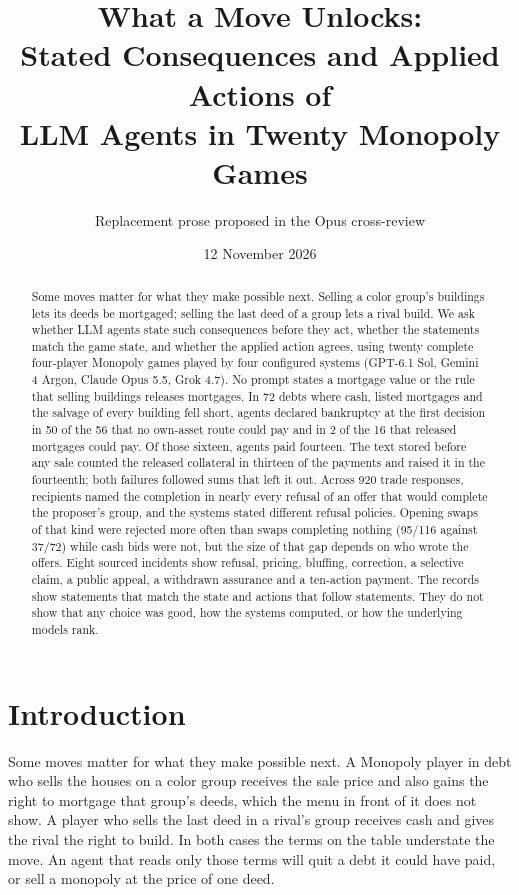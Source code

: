 \documentclass[11pt,letterpaper]{article}
\title{What a Move Unlocks:\\Stated Consequences and Applied Actions of\\LLM Agents in Twenty Monopoly Games}
\author{Replacement prose proposed in the Opus cross-review}
\date{12 November 2026}
\begin{document}
\maketitle

\begin{abstract}
Some moves matter for what they make possible next. Selling a color group's buildings lets its deeds be mortgaged; selling the last deed of a group lets a rival build. We ask whether LLM agents state such consequences before they act, whether the statements match the game state, and whether the applied action agrees, using twenty complete four-player Monopoly games played by four configured systems (GPT-6.1 Sol, Gemini 4 Argon, Claude Opus 5.5, Grok 4.7). No prompt states a mortgage value or the rule that selling buildings releases mortgages. In 72 debts where cash, listed mortgages and the salvage of every building fell short, agents declared bankruptcy at the first decision in 50 of the 56 that no own-asset route could pay and in 2 of the 16 that released mortgages could pay. Of those sixteen, agents paid fourteen. The text stored before any sale counted the released collateral in thirteen of the payments and raised it in the fourteenth; both failures followed sums that left it out. Across 920 trade responses, recipients named the completion in nearly every refusal of an offer that would complete the proposer's group, and the systems stated different refusal policies. Opening swaps of that kind were rejected more often than swaps completing nothing (95/116 against 37/72) while cash bids were not, but the size of that gap depends on who wrote the offers. Eight sourced incidents show refusal, pricing, bluffing, correction, a selective claim, a public appeal, a withdrawn assurance and a ten-action payment. The records show statements that match the state and actions that follow statements. They do not show that any choice was good, how the systems computed, or how the underlying models rank.
\end{abstract}

\section{Introduction}

Some moves matter for what they make possible next. A Monopoly player in debt who sells the houses on a color group receives the sale price and also gains the right to mortgage that group's deeds, which the menu in front of it does not show. A player who sells the last deed in a rival's group receives cash and gives the rival the right to build. In both cases the terms on the table understate the move. An agent that reads only those terms will quit a debt it could have paid, or sell a monopoly at the price of one deed.
\end{document}
